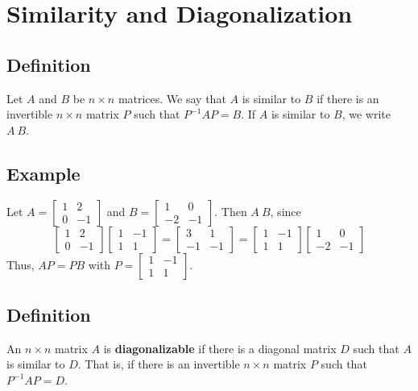 \section{Similarity and Diagonalization}

\subsection*{Definition}
Let $A$ and $B$ be $n\times n$ matrices. We say that $A$ is similar to $B$ if there
is an invertible $n\times n$ matrix $P$ such that $P^{-1}AP=B$. If $A$ is similar to $B$,
we write $A~B$.

\subsection*{Example}
Let $A=\begin{bmatrix}
        1 & 2  \\
        0 & -1
    \end{bmatrix}$ and $B=\begin{bmatrix}
        1  & 0  \\
        -2 & -1
    \end{bmatrix}$. Then $A~B$, since
\[
    \begin{bmatrix}
        1 & 2  \\
        0 & -1
    \end{bmatrix}\begin{bmatrix}
        1 & -1 \\
        1 & 1
    \end{bmatrix}=\begin{bmatrix}
        3  & 1  \\
        -1 & -1
    \end{bmatrix}=\begin{bmatrix}
        1 & -1 \\
        1 & 1
    \end{bmatrix}\begin{bmatrix}
        1  & 0  \\
        -2 & -1
    \end{bmatrix}
\]
Thus, $AP=PB$ with $P=\begin{bmatrix}
        1 & -1 \\
        1 & 1
    \end{bmatrix}$.

\subsection*{Definition}
An $n\times n$ matrix $A$ is \textbf{diagonalizable} if there is a diagonal matrix
$D$ such that $A$ is similar to $D$. That is, if there is an invertible $n\times n$ matrix
$P$ such that $P^{-1}AP=D$.

